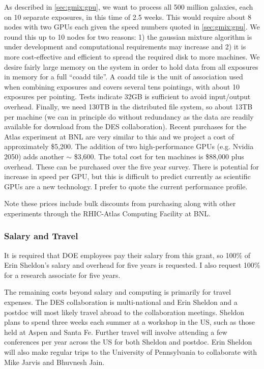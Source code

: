 \documentclass[12pt]{article}
\begin{document}
As described in \ref{sec:gmix:gpu}, we want to process all 500 million
galaxies, each on 10 separate exposures, in this time of 2.5 weeks. This would
require about 8 nodes with two GPUs each given the speed numbers quoted in
\ref{sec:gmix:gpu}.  We round this up to 10 nodes for two reasons: 1) the
gaussian mixture algorithm is under development and computational requirements
may increase and 2) it is more cost-effective and efficient to spread the
required disk to more machines.  We desire fairly large memory on the system in
order to hold data from all exposures in memory for a full ``coadd tile''. A
coadd tile is the unit of association used when combining exposures and covers
several tens pointings, with about 10 exposures per pointing.  Tests indicate
32GB is sufficient to avoid input/output overhead.  Finally, we need 130TB in
the distributed file system, so about 13TB per machine (we can in principle do
without redundancy as the data are readily available for download from the DES
collaboration).  Recent purchases for the Atlas experiment at BNL are very
similar to this and we project a cost of approximately \$5,200.  The addition
of two high-performance GPUs (e.g. Nvidia 2050) adds another $\sim$ \$3,600.
The total cost for ten machines is \$88,000 plus overhead.  These can be
purchased over the five year survey.  There is potential for increase in speed
per GPU, but this is difficult to predict currently as scientific GPUs are a
new technology.  I prefer to quote the current performance profile.

Note these prices include bulk discounts from purchasing along with other
experiments through the RHIC-Atlas Computing Facility at BNL.  



\subsubsection{Salary and Travel}

It is required that DOE employees pay their salary from this grant, so 100\% of
Erin Sheldon's salary and overhead for five years is requested.  I also request
100\% for a research associate for five years.

The remaining costs beyond salary and computing is primarily for travel
expenses.   The DES collaboration is multi-national and Erin Sheldon and a
postdoc will most likely travel abroad to the collaboration meetings.  Sheldon
plans to spend three weeks each summer at a workshop in the US, such as those
held at Aspen and Santa Fe.  Further travel will involve attending a few
conferences per year across the US for both Sheldon and postdoc.  Erin Sheldon
will also make regular trips to the University of Pennsylvania to collaborate
with Mike Jarvis and Bhuvnesh Jain.
\end{document}
